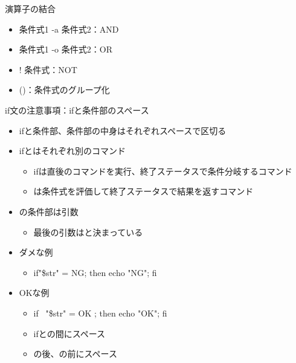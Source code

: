 \documentclass[12pt,aspectratio=169]{beamer}
\begin{document}
\begin{frame}{演算子の結合}

  \begin{itemize}
    \item 条件式1 -a 条件式2：AND
    \item 条件式1 -o 条件式2：OR
    \item ! 条件式：NOT
    \item ()：条件式のグループ化
  \end{itemize}

\end{frame}

\begin{frame}{if文の注意事項：ifと条件部のスペース}

  \begin{itemize}
    \item ifと条件部、条件部の中身はそれぞれスペースで区切る
    \item ifと\lbrack はそれぞれ別のコマンド
    \begin{itemize}
      \item ifは直後のコマンドを実行、終了ステータスで条件分岐するコマンド
      \item \lbrack は条件式を評価して終了ステータスで結果を返すコマンド
    \end{itemize}
    \item \lbrack の条件部は引数
    \begin{itemize}
      \item 最後の引数は\rbrack と決まっている
    \end{itemize}
    \item ダメな例
    \begin{itemize}
      \item if\lbrack "\$str" = NG\rbrack ; then echo "NG"; fi
    \end{itemize}
    \item OKな例
    \begin{itemize}
      \item if \lbrack\ "\$str" = OK \rbrack ; then echo "OK"; fi
      \item ifと\lbrack の間にスペース
      \item \lbrack の後、\rbrack の前にスペース
    \end{itemize}

  \end{itemize}

\end{frame}
\end{document}
